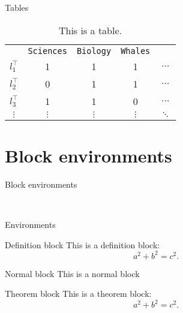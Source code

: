 \documentclass[aspectratio=43]{beamer}
\begin{document}
\begin{frame}{Tables}

\begin{table}
\caption{This is a table.}
\begin{tabular}{c c c c c}
& \texttt{Sciences} & \texttt{Biology} & \texttt{Whales} & \\
$l_1^\top$ & 1 & 1 & 1 & $\dots$\\
$l_2^\top$ & 0 & 1 & 1 & $\dots$\\
$l_3^\top$ & 1 & 1 & 0 & $\dots$\\
$\vdots$ & $\vdots$ & $\vdots$ & $\vdots$ & $\ddots$ \\
\end{tabular}
\end{table}

\end{frame}


\section{Block environments}

\begin{frame}{Block environments}

\begin{itemize}
\setlength{\itemsep}{40pt}
 \\
\end{itemize}

\end{frame}


\begin{frame}{Environments}

\begin{defnt}{Definition block}
This is a definition block: $$a^2 + b^2 = c^2.$$
\end{defnt}

\begin{mblock}{Normal block}
This is a normal block
\end{mblock}

\begin{thm}{Theorem block}
This is a theorem block: $$a^2 + b^2 = c^2.$$
\end{thm}

\end{frame}
\end{document}
